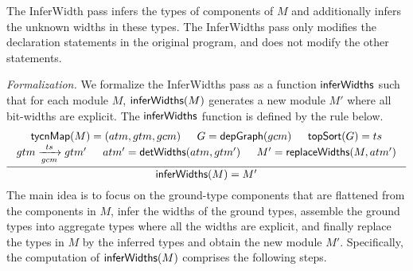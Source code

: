 

The InferWidth pass infers the types of components of $M$ and additionally infers the unknown widths in these types. The InferWidths pass only modifies the declaration statements in the original program, and does not modify the other statements. 

\smallskip
\noindent\emph{Formalization.}
We formalize the InferWidths pass as a function ${\sf inferWidths}$ such that for each module $M$, ${\sf inferWidths}(M)$ generates a new module $M'$ where all bit-widths are explicit. The ${\sf inferWidths}$ function is defined by the rule below. 
  \begin{gather*}
    \infer[xx]
     {\seqq{\inferwidths(M) = M'}}
     {
     \begin{array}{c}
      \tycnmap(M) = (atm, gtm, gcm) \hspace{15pt} G = \depgraph(gcm) \hspace{15pt} \topsort(G) = ts\\
    gtm \xrightarrow[gcm]{ts} gtm'  \hspace{15pt}  atm' = \detwidths(atm, gtm') \hspace{15pt} M' = \replacewidths(M, atm')
    \end{array}
    }
  \end{gather*}
The main idea is to focus on the ground-type components that are flattened from the components in $M$, infer the widths of the ground types, assemble the ground types into aggregate types where all the widths are explicit, and finally replace the types in $M$ by the inferred types and obtain the new module $M'$. Specifically, the computation of ${\sf inferWidths}(M)$ comprises the following steps. 
